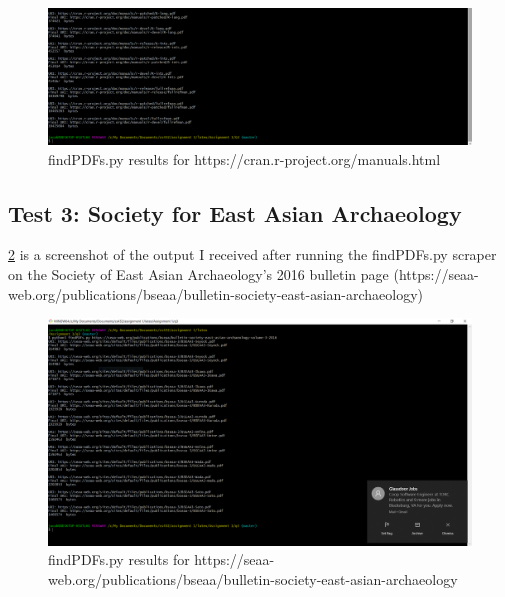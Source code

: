 \documentclass[12pt]{article}
\begin{document}
\begin{figure}[H]
    \centering
    \includegraphics[trim=0 30 400 10, clip, width=\textwidth] {Q3/q3_cranRManuals2.png}
    \caption{findPDFs.py results for https://cran.r-project.org/manuals.html}
    \label{fig:q3ResponsecranR_2}
\end{figure}

\subsection*{Test 3: Society for East Asian Archaeology} 
\ref{fig:q3ResponseSEAA_1} is a screenshot of the output I received after running the findPDFs.py scraper on the Society of East Asian Archaeology's 2016 bulletin page (https://seaa-web.org/publications/bseaa/bulletin-society-east-asian-archaeology)
\begin{figure}[H]
    \centering
    \includegraphics[trim=0 20 400 20, clip, width=\textwidth] {Q3/q3-seaaBulletin2016.png}
    \caption{findPDFs.py results for https://seaa-web.org/publications/bseaa/bulletin-society-east-asian-archaeology}
    \label{fig:q3ResponseSEAA_1}
\end{figure}
\end{document}
